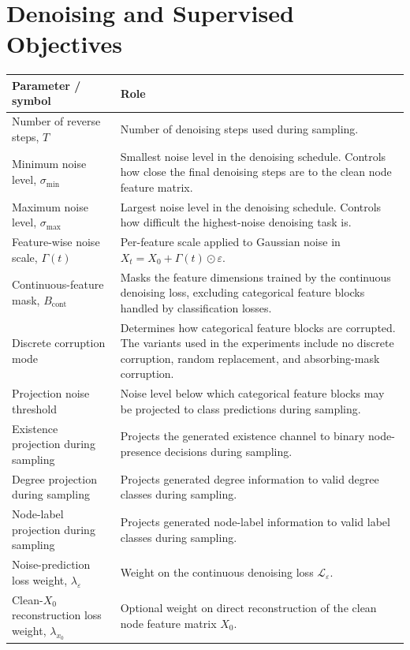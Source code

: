 \section{Denoising and Supervised Objectives}

\begin{table}[p]
\centering
\footnotesize
\begin{tabularx}{\textwidth}{@{}p{}X@{}}
\toprule
Parameter / symbol & Role \\
\midrule
Number of reverse steps, \(T\) & Number of denoising steps used during sampling. \\
Minimum noise level, \(\sigma_{\min}\) & Smallest noise level in the denoising schedule. Controls how close the final denoising steps are to the clean node feature matrix. \\
Maximum noise level, \(\sigma_{\max}\) & Largest noise level in the denoising schedule. Controls how difficult the highest-noise denoising task is. \\
Feature-wise noise scale, \(\Gamma(t)\) & Per-feature scale applied to Gaussian noise in \(X_t=X_0+\Gamma(t)\odot\varepsilon\). \\
Continuous-feature mask, \(B_{\mathrm{cont}}\) & Masks the feature dimensions trained by the continuous denoising loss, excluding categorical feature blocks handled by classification losses. \\
Discrete corruption mode & Determines how categorical feature blocks are corrupted. The variants used in the experiments include no discrete corruption, random replacement, and absorbing-mask corruption. \\
Projection noise threshold & Noise level below which categorical feature blocks may be projected to class predictions during sampling. \\
Existence projection during sampling & Projects the generated existence channel to binary node-presence decisions during sampling. \\
Degree projection during sampling & Projects generated degree information to valid degree classes during sampling. \\
Node-label projection during sampling & Projects generated node-label information to valid label classes during sampling. \\
Noise-prediction loss weight, \(\lambda_{\varepsilon}\) & Weight on the continuous denoising loss \(\mathcal{L}_{\varepsilon}\). \\
Clean-\(X_0\) reconstruction loss weight, \(\lambda_{x_0}\) & Optional weight on direct reconstruction of the clean node feature matrix \(\hat{X}_0\). \\

\end{tabularx}
\end{table}

